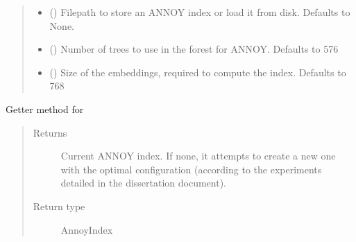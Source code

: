 \documentclass[letterpaper,10pt,english]{sphinxmanual}
\begin{document}
\begin{fulllineitems}
\begin{fulllineitems}
\begin{quote}
\begin{description}
\begin{itemize}
\item {} 
 (\sphinxstyleliteralemphasis{\sphinxupquote{, }}) \textendash{} Filepath to store an ANNOY index or load
it from disk. Defaults to None.

\item {} 
 (\sphinxstyleliteralemphasis{\sphinxupquote{, }}) \textendash{} Number of trees to use in the forest for ANNOY.
Defaults to 576

\item {} 
 (\sphinxstyleliteralemphasis{\sphinxupquote{, }}) \textendash{} Size of the embeddings, required to compute
the index. Defaults to 768

\end{itemize}

\end{description}\end{quote}

\end{fulllineitems}


\begin{fulllineitems}
\label{\detokenize{code:semantic_search.SemanticSearch.annoy_index}}
Getter method for 
\begin{quote}\begin{description}
\item[{Returns}] \leavevmode
Current ANNOY index. If none, it attempts to create a new one
with the optimal configuration (according to the experiments detailed
in the dissertation document).

\item[{Return type}] \leavevmode
AnnoyIndex

\end{description}\end{quote}


\end{fulllineitems}
\end{fulllineitems}
\end{document}
